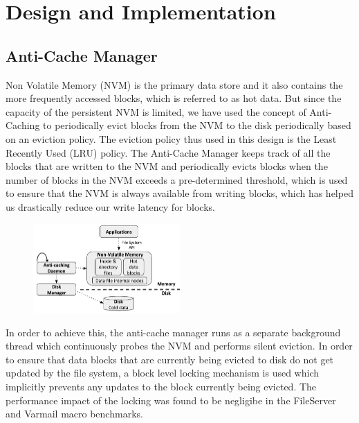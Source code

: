 \section{Design and Implementation}
\label{sec-design}
\subsection{Anti-Cache Manager}
Non Volatile Memory (NVM) is the primary data store and it also contains the more frequently accessed blocks, which is referred to as hot data. But since the capacity of the persistent NVM is limited, we have used the concept of Anti-Caching to periodically evict blocks from the NVM to the disk periodically based on an eviction policy. The eviction policy thus used in this design is the Least Recently Used (LRU) policy. The Anti-Cache Manager keeps track of all the blocks that are written to the NVM and periodically evicts blocks when the number of blocks in the NVM exceeds a pre-determined threshold, which is used to ensure that the NVM is always available from writing blocks, which has helped us drastically reduce our write latency for blocks.

\begin{figure}
\centering
\vspace{-0.2in}
\includegraphics[width=0.5\textwidth]{figs/bpfs.pdf}
\vspace{-0.2in}
\end{figure}

In order to achieve this, the anti-cache manager runs as a separate background thread which continuously probes the NVM and performs silent eviction. In order to ensure that data blocks that are currently being evicted to disk do not get updated by the file system, a block level locking mechanism is used which implicitly prevents any updates to the block currently being evicted. The performance impact of the locking was found to be negligibe in the FileServer and Varmail macro benchmarks. 

